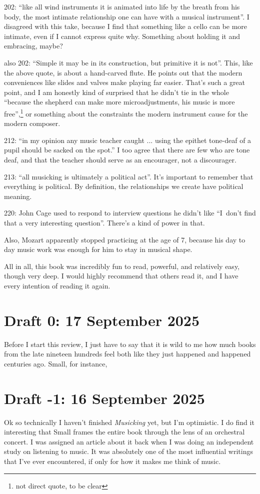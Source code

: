 \documentclass[12pt]{article}
\newcommand{\say}[1]{``#1''}
\renewcommand{\,}{\textsuperscript{,}}
\begin{document}
202: \say{like all wind instruments it is animated into life by the breath from his body, the most intimate relationship one can have with a musical instrument}. I disagreed with this take, because I find that something like a cello can be more intimate, even if I cannot express quite why.  
Something about holding it and embracing, maybe?

also 202: \say{Simple it may be in its construction, but primitive it is not}. This, like the above quote, is about a hand-carved flute.  
He points out that the modern conveniences like slides and valves make playing far easier.  
That's such a great point, and I am honestly kind of surprised that he didn't tie in the whole \say{because the shepherd can make more microadjustments, his music is more free},\footnote{not direct quote, to be clear} or something about the constraints the modern instrument cause for the modern composer.

212: \say{in my opinion any music teacher caught ... using the epithet tone-deaf of a pupil should be sacked on the spot.}  
I too agree that there are few who are tone deaf, and that the teacher should serve as an encourager, not a discourager.

213: \say{all musicking is ultimately a political act}.  
It's important to remember that everything is political.  
By definition, the relationships we create have political meaning.

220: John Cage used to respond to interview questions he didn't like \say{I don’t find that a very interesting question}.  
There's a kind of power in that.

Also, Mozart apparently stopped practicing at the age of 7, because his day to day music work was enough for him to stay in musical shape.

All in all, this book was incredibly fun to read, powerful, and relatively easy, though very deep.  
I would highly recommend that others read it, and I have every intention of reading it again.

\section{Draft 0: 17 September 2025}  
Before I start this review, I just have to say that it is wild to me how much books from the late nineteen hundreds feel both like they just happened and happened centuries ago.  
Small, for instance,

\section{Draft -1: 16 September 2025}  
Ok so technically I haven't finished \textit{Musicking} yet, but I'm optimistic.  
I do find it interesting that Small frames the entire book through the lens of an orchestral concert.  
I was assigned an article about it back when I was doing an independent study on listening to music.  
It was absolutely one of the most influential writings that I've ever encountered, if only for how it makes me think of music.
\end{document}
